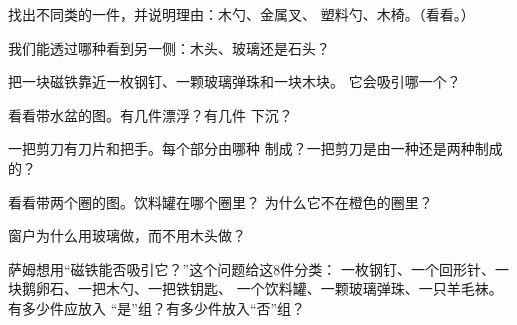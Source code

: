 \begin{exercise}[$\star$]\label{exo:g1:materials-around-us:4}
找出不同类的一件，并说明理由：木勺、金属叉、
塑料勺、木椅。（看看。）
\end{exercise}

\begin{exercise}[$\star$]\label{exo:g1:materials-around-us:5}
我们能透过哪种看到另一侧：木头、玻璃还是石头？
\end{exercise}

\begin{exercise}[$\star$]\label{exo:g1:materials-around-us:6}
把一块磁铁靠近一枚钢钉、一颗玻璃弹珠和一块木块。
它会吸引哪一个？
\end{exercise}

\begin{exercise}[$\star$]\label{exo:g1:materials-around-us:7}
看看带水盆的图。有几件漂浮？有几件
下沉？
\end{exercise}

\begin{exercise}[$\star$]\label{exo:g1:materials-around-us:8}
一把剪刀有刀片和把手。每个部分由哪种
制成？一把剪刀是由一种还是两种制成的？
\end{exercise}

\begin{exercise}[$\star$]\label{exo:g1:materials-around-us:9}
看看带两个圈的图。饮料罐在哪个圈里？
为什么它不在橙色的圈里？
\end{exercise}

\begin{exercise}[$\star\star$]\label{exo:g1:materials-around-us:10}
窗户为什么用玻璃做，而不用木头做？
\end{exercise}

\begin{exercise}[$\star\star$]\label{exo:g1:materials-around-us:11}
萨姆想用“磁铁能否吸引它？”这个问题给这8件分类：
一枚钢钉、一个回形针、一块鹅卵石、一把木勺、一把铁钥匙、
一个饮料罐、一颗玻璃弹珠、一只羊毛袜。有多少件应放入
“是”组？有多少件放入“否”组？
\end{exercise}
